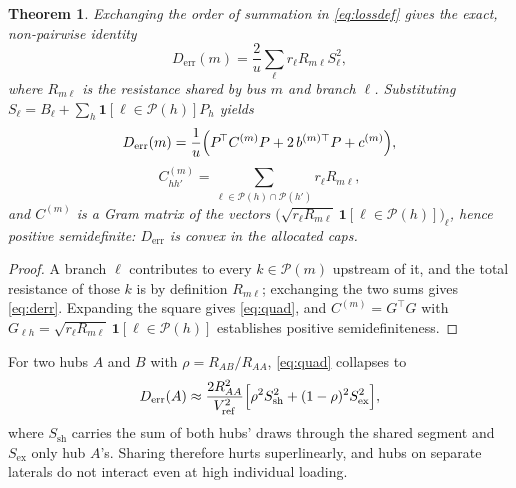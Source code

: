 \documentclass[lettersize,journal]{IEEEtran}
\newtheorem{theorem}{Theorem}
\newcommand{\Derr}{D_{\mathrm{err}}}
\begin{document}
\begin{theorem}\label{thm:nhub}
Exchanging the order of summation in \eqref{eq:lossdef} gives the exact,
non-pairwise identity
\begin{equation}\label{eq:derr}
\Derr(m)=\frac{2}{u}\sum_{\ell} r_\ell R_{m\ell} S_\ell^{2},
\end{equation}
where $R_{m\ell}$ is the resistance shared by bus $m$ and branch $\ell$.
Substituting $S_\ell=B_\ell+\sum_h \mathbf{1}[\ell\in\mathcal{P}(h)]P_h$ yields
\begin{equation}\label{eq:quad}
\Derr(m)=\frac{1}{u}\Bigl(P^{\!\top}C^{(m)}P+2\,b^{(m)\top}P+c^{(m)}\Bigr),
\end{equation}
\begin{equation}\label{eq:cmat}
C^{(m)}_{hh'}=\!\!\!\sum_{\ell\in\mathcal{P}(h)\cap\mathcal{P}(h')}\!\!\! r_\ell R_{m\ell},
\end{equation}
and $C^{(m)}$ is a Gram matrix of the vectors
$\bigl(\sqrt{r_\ell R_{m\ell}}\,\mathbf{1}[\ell\in\mathcal{P}(h)]\bigr)_\ell$,
hence positive semidefinite: $\Derr$ is convex in the allocated caps.
\end{theorem}
\begin{proof}
A branch $\ell$ contributes to every $k\in\mathcal{P}(m)$ upstream of it, and
the total resistance of those $k$ is by definition $R_{m\ell}$; exchanging the
two sums gives \eqref{eq:derr}. Expanding the square gives \eqref{eq:quad}, and
$C^{(m)}=G^{\!\top}G$ with $G_{\ell h}=\sqrt{r_\ell R_{m\ell}}\,
\mathbf{1}[\ell\in\mathcal{P}(h)]$ establishes positive semidefiniteness.
\end{proof}

For two hubs $A$ and $B$ with $\rho=R_{AB}/R_{AA}$, \eqref{eq:quad} collapses to
\begin{equation}\label{eq:pair}
\Derr(A)\approx\frac{2R_{AA}^{2}}{V_{\mathrm{ref}}^{2}}
\Bigl[\rho^{2}S_{\mathrm{sh}}^{2}+(1-\rho)^{2}S_{\mathrm{ex}}^{2}\Bigr],
\end{equation}
where $S_{\mathrm{sh}}$ carries the sum of both hubs' draws through the shared
segment and $S_{\mathrm{ex}}$ only hub $A$'s. Sharing therefore hurts
superlinearly, and hubs on separate laterals do not interact even at high
individual loading.
\end{document}
